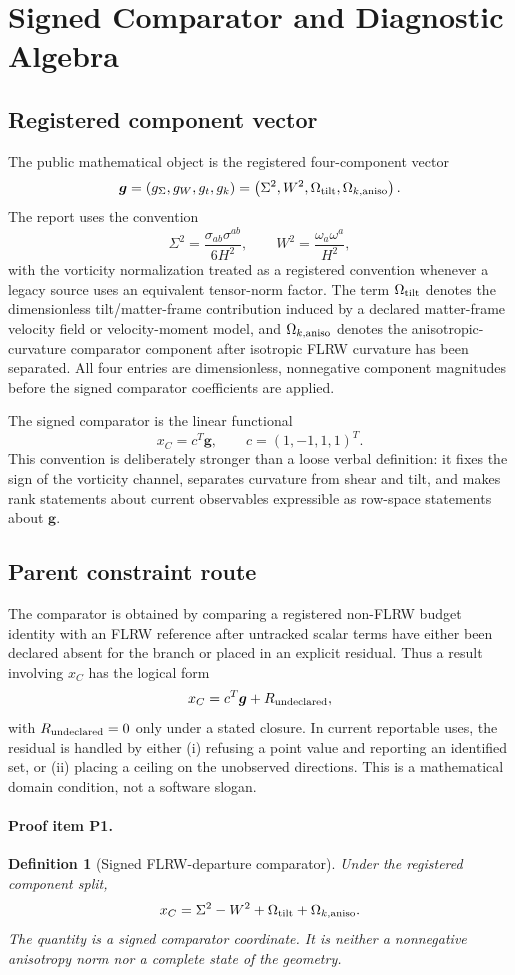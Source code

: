 \documentclass[11pt]{article}
\newcommand{\Sig}{\Sigma^2}
\newcommand{\Wsq}{W^2}
\newcommand{\Omt}{\Omega_{\rm tilt}}
\newcommand{\Omk}{\Omega_{k,{\rm aniso}}}
\newtheorem{definition}{Definition}
\begin{document}
\section{Signed Comparator and Diagnostic Algebra}
\subsection{Registered component vector}
The public mathematical object is the registered four-component vector
\[
  \bm g=(g_\Sigma,g_W,g_t,g_k)
  =\left(\Sig,\Wsq,\Omt,\Omk\right).
\]
The report uses the convention
\[
  \Sig=\frac{\sigma_{ab}\sigma^{ab}}{6H^2},
  \qquad
  \Wsq=\frac{\omega_a\omega^a}{H^2},
\]
with the vorticity normalization treated as a registered convention whenever a legacy source uses an equivalent tensor-norm factor.  The term \(\Omt\) denotes the dimensionless tilt/matter-frame contribution induced by a declared matter-frame velocity field or velocity-moment model, and \(\Omk\) denotes the anisotropic-curvature comparator component after isotropic FLRW curvature has been separated.  All four entries are dimensionless, nonnegative component magnitudes before the signed comparator coefficients are applied.

The signed comparator is the linear functional
\[
  x_C=c^T\bm g,
  \qquad c=(1,-1,1,1)^T .
\]
This convention is deliberately stronger than a loose verbal definition: it fixes the sign of the vorticity channel, separates curvature from shear and tilt, and makes rank statements about current observables expressible as row-space statements about \(\bm g\).

\subsection{Parent constraint route}
The comparator is obtained by comparing a registered non-FLRW budget identity with an FLRW reference after untracked scalar terms have either been declared absent for the branch or placed in an explicit residual.  Thus a result involving \(x_C\) has the logical form
\[
  x_C=c^T\bm g + R_{\rm undeclared},
\]
with \(R_{\rm undeclared}=0\) only under a stated closure.  In current reportable uses, the residual is handled by either (i) refusing a point value and reporting an identified set, or (ii) placing a ceiling on the unobserved directions.  This is a mathematical domain condition, not a software slogan.
\paragraph{Proof item P1.}
\begin{definition}[Signed FLRW-departure comparator]
Under the registered component split,
\begin{equation}
  x_C=\Sig-\Wsq+\Omt+\Omk .
  \label{eq:xc}
\end{equation}
The quantity is a signed comparator coordinate.  It is neither a nonnegative anisotropy norm nor a complete state of the geometry.
\end{definition}
\end{document}
